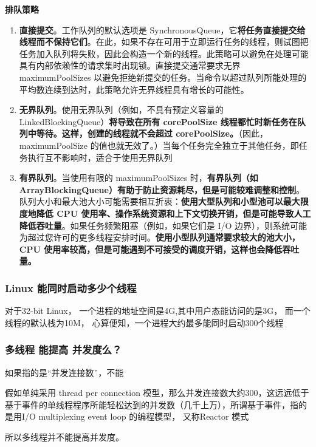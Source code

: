 \documentclass[UTF8,a4paper,8pt]{ctexart}
\begin{document}
			\textbf{排队策略}
				\begin{enumerate}
					\item \textbf{直接提交}。工作队列的默认选项是 SynchronousQueue，它\textbf{将任务直接提交给线程而不保持它们}。在此，如果不存在可用于立即运行任务的线程，则试图把任务加入队列将失败，因此会构造一个新的线程。此策略可以避免在处理可能具有内部依赖性的请求集时出现锁。直接提交通常要求无界 maximumPoolSizes 以避免拒绝新提交的任务。当命令以超过队列所能处理的平均数连续到达时，此策略允许无界线程具有增长的可能性。 
					
					\item \textbf{无界队列}。使用无界队列（例如，不具有预定义容量的 LinkedBlockingQueue）\textbf{将导致在所有 corePoolSize 线程都忙时新任务在队列中等待。这样，创建的线程就不会超过 corePoolSize。}（因此，maximumPoolSize 的值也就无效了。）当每个任务完全独立于其他任务，即任务执行互不影响时，适合于使用无界队列 
					
					\item  \textbf{有界队列}。当使用有限的 maximumPoolSizes 时，\textbf{有界队列（如 ArrayBlockingQueue）有助于防止资源耗尽，但是可能较难调整和控制}。队列大小和最大池大小可能需要相互折衷：\textbf{使用大型队列和小型池可以最大限度地降低 CPU 使用率、操作系统资源和上下文切换开销，但是可能导致人工降低吞吐量}。如果任务频繁阻塞（例如，如果它们是 I/O 边界），则系统可能为超过您许可的更多线程安排时间。\textbf{使用小型队列通常要求较大的池大小，CPU 使用率较高，但是可能遇到不可接受的调度开销，这样也会降低吞吐量。}
				\end{enumerate}
				
		\subsubsection{Linux  能同时启动多少个线程}
			对于32-bit Linux， 一个进程的地址空间是4G,其中用户态能访问的是3G， 而一个线程的默认栈为10M， 心算便知，一个进程大约最多能同时启动300个线程	
		
		\subsubsection{多线程 能提高 并发度么？}
			如果指的是“并发连接数”，不能
			
			假如单纯采用 thread per connection 模型，那么并发连接数大约300，这远远低于基于事件的单线程程序所能轻松达到的并发数（几千上万），所谓基于事件，指的是用I/O multiplexing event loop 的编程模型， 又称Reactor 模式
			
			所以多线程并不能提高并发度。
 			
\end{document}
